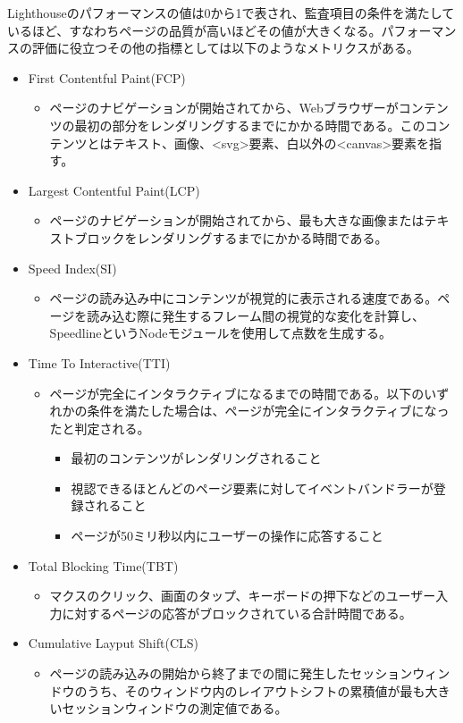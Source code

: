Lighthouseのパフォーマンスの値は0から1で表され、監査項目の条件を満たしているほど、すなわちページの品質が高いほどその値が大きくなる。パフォーマンスの評価に役立つその他の指標としては以下のようなメトリクスがある。

\begin{itemize}
    \item First Contentful Paint(FCP)
    \begin{itemize}
        \item ページのナビゲーションが開始されてから、Webブラウザーがコンテンツの最初の部分をレンダリングするまでにかかる時間である。このコンテンツとはテキスト、画像、<svg>要素、白以外の<canvas>要素を指す。
    \end{itemize}
    \item Largest Contentful Paint(LCP)
    \begin{itemize}
        \item ページのナビゲーションが開始されてから、最も大きな画像またはテキストブロックをレンダリングするまでにかかる時間である。
    \end{itemize}
    \item Speed Index(SI)
    \begin{itemize}
        \item ページの読み込み中にコンテンツが視覚的に表示される速度である。ページを読み込む際に発生するフレーム間の視覚的な変化を計算し、SpeedlineというNodeモジュールを使用して点数を生成する。
    \end{itemize}
    \item Time To Interactive(TTI)
    \begin{itemize}
        \item ページが完全にインタラクティブになるまでの時間である。以下のいずれかの条件を満たした場合は、ページが完全にインタラクティブになったと判定される。
        \begin{itemize}
            \item 最初のコンテンツがレンダリングされること
            \item 視認できるほとんどのページ要素に対してイベントバンドラーが登録されること
            \item ページが50ミリ秒以内にユーザーの操作に応答すること
        \end{itemize}
    \end{itemize}
    \item Total Blocking Time(TBT)
    \begin{itemize}
        \item マクスのクリック、画面のタップ、キーボードの押下などのユーザー入力に対するページの応答がブロックされている合計時間である。
    \end{itemize}
    \item Cumulative Layput Shift(CLS)
    \begin{itemize}
        \item ページの読み込みの開始から終了までの間に発生したセッションウィンドウのうち、そのウィンドウ内のレイアウトシフトの累積値が最も大きいセッションウィンドウの測定値である。
    \end{itemize}
\end{itemize}

